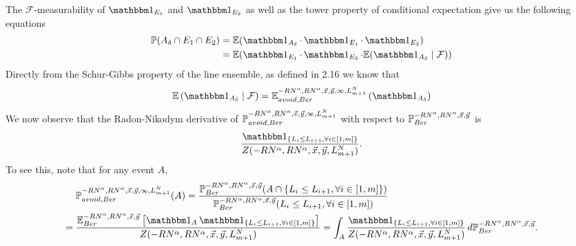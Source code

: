 	The $\mathcal{F}$-measurability of $\indic_{E_1}$ and $\indic_{E_2}$ as well as the tower property of conditional expectation give us the following equations
	\begin{align*}
	\pr(A_\delta\cap E_1\cap E_2)&=\ex(\indic_{A_\delta}\cdot \indic_{E_1}\cdot \indic_{E_2})\\
	&=\ex(\indic_{E_1}\cdot \indic_{E_2}\cdot\ex(\indic_{A_\delta}\mid \mathcal{F}))
	\end{align*}
	Directly from the Schur-Gibbs property of the line ensemble, as defined in 2.16 we know that 
	\[\ex\left(\indic_{A_\delta}\mid \mathcal{F}\right)=\ex_{avoid,Ber}^{-RN^\alpha,RN^\alpha,\vec x, \vec y, \infty, L_{m+1}^N}\left(\indic_{A_\delta}\right)
	\]
	We now observe that the Radon-Nikodym derivative of $\mathbb{P}_{avoid,Ber}^{-RN^\alpha,RN^\alpha,\vec x, \vec y, \infty, L_{m+1}^N}$ with respect to $\mathbb{P}_{Ber}^{-RN^\alpha, RN^\alpha,\vec x,\vec y}$ is $$\frac{\indic_{\left\{L_i\leq L_{i+1},\forall i\in [1,m]\right\}}}{Z(-RN^\alpha,RN^\alpha,\vec x, \vec y, L_{m+1}^N)}.$$ To see this, note that for any event $A$,
	\begin{align*}
	&\pr_{avoid,Ber}^{-RN^\alpha,RN^\alpha,\vec x, \vec y, \infty, L_{m+1}^N}(A) = \frac{\pr_{Ber}^{-RN^\alpha,RN^\alpha,\vec x, \vec y}(A\cap\left\{L_i\leq L_{i+1},\forall i\in [1,m]\right\})}{\pr_{Ber}^{-RN^\alpha,RN^\alpha,\vec x, \vec y}(L_i\leq L_{i+1},\forall i\in [1,m])}\\
	= \; & \frac{\ex_{Ber}^{-RN^\alpha,RN^\alpha,\vec x, \vec y}\left[\indic_A \indic_{\left\{L_i\leq L_{i+1},\forall i\in [1,m]\right\}}\right]}{Z(-RN^\alpha,RN^\alpha,\vec{x},\vec{y},L^N_{m+1})} = \int_A \frac{\indic_{\left\{L_i\leq L_{i+1},\forall i\in [1,m]\right\}}}{Z(-RN^\alpha,RN^\alpha,\vec x, \vec y, L_{m+1}^N)}\,d\pr_{Ber}^{-RN^\alpha,RN^\alpha,\vec x, \vec y}.
	\end{align*}
	
